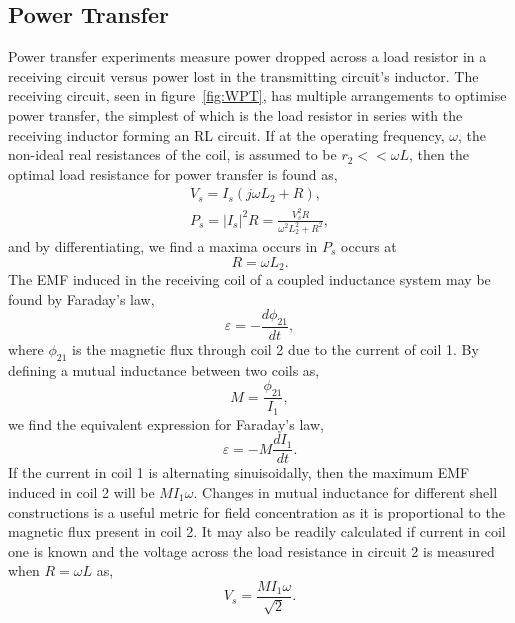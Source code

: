 \documentclass[11pt]{iopart}
\begin{document}
\subsection{Power Transfer}
Power transfer experiments measure power dropped across a load
resistor in a receiving circuit versus power lost in the transmitting
circuit's inductor. The receiving circuit, seen in
figure~\ref{fig:WPT}, has multiple arrangements to optimise power
transfer, the simplest of which is the load resistor in series with
the receiving inductor forming an RL circuit. If at the operating
frequency, $\omega$, the non-ideal real resistances of the coil, is
assumed to be $r_2 << \omega L$, then the optimal load resistance for
power transfer is found as,
\vspace{-1em}
\begin{equation}
  \begin{split}
  V_s = I_s (j\omega L_2 + R),  \\
  P_s = |I_s|^2R = \frac{V_s^2R}{\omega^2L_2^2 + R^2},
  \label{eqn:RL-max}
  \end{split}
\end{equation}
and by differentiating, we find a maxima occurs in $P_s$ occurs at
\begin{equation}
  R = \omega L_2.
\end{equation}
The EMF induced in the receiving coil of a coupled inductance system may be found by Faraday's law,
\vspace{-0.5em}
\begin{equation}
  \varepsilon = -\frac{d\phi_{21}}{dt},
\end{equation}
where $\phi_{21}$ is the magnetic flux through coil 2 due
to the current of coil 1.  By defining a mutual inductance between two
coils as,
\vspace{-0.5em}
\begin{equation}
  M = \frac{\phi_{21}}{I_1},
\end{equation}
we find the equivalent expression for Faraday's law,
\vspace{-0.5em}
\begin{equation}
  \varepsilon = -M\frac{dI_{1}}{dt}.
  \label{eqn:M}
\end{equation}
If the current in coil 1 is alternating sinuisoidally, then the
maximum EMF induced in coil 2 will be $M I_1 \omega$. Changes in mutual
inductance for different shell constructions is a useful metric for
field concentration as it is proportional to the magnetic flux present
in coil 2. It may also be readily calculated if current in coil one is
known and the voltage across the load resistance in circuit 2 is
measured when $R = \omega L$ as,
\begin{equation}
  V_s = \frac{MI_1\omega}{\sqrt{2}}.
  \label{eqn:MVs}
\end{equation}
\end{document}
